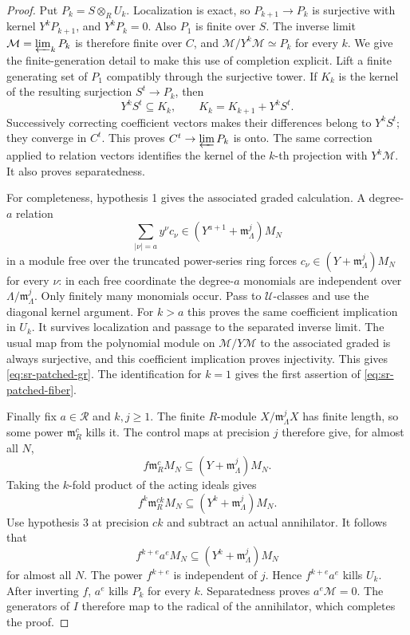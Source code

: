 \begin{proof}
Put $P_k=S\otimes_R U_k$.
Localization is exact, so $P_{k+1}\to P_k$ is surjective with kernel
$Y^kP_{k+1}$, and $Y^kP_k=0$.
Also $P_1$ is finite over $S$.
The inverse limit
$\mathcal M=\varprojlim_kP_k$ is therefore finite over $C$,
and $\mathcal M/Y^k\mathcal M\simeq P_k$ for every $k$.
We give the finite-generation detail to make this use of completion
explicit. Lift a finite generating set of $P_1$ compatibly through the
surjective tower. If $K_k$ is the kernel of the resulting surjection
$S^t\to P_k$, then
\[
             Y^kS^t\subseteq K_k,\qquad
             K_k=K_{k+1}+Y^kS^t.
\]
Successively correcting coefficient vectors makes their differences
belong to $Y^kS^t$; they converge in $C^t$.
This proves $C^t\to\varprojlim P_k$ is onto.
The same correction applied to relation vectors identifies the
kernel of the $k$-th projection with $Y^k\mathcal M$.
It also proves separatedness.

For completeness, hypothesis 1 gives the associated graded
calculation. A degree-$a$ relation
\[
               \sum_{|\nu|=a}y^\nu c_\nu
                           \in(Y^{a+1}+\mathfrak m_\Lambda^j)M_N
\]
in a module free over the truncated power-series ring forces
$c_\nu\in(Y+\mathfrak m_\Lambda^j)M_N$ for every $\nu$:
in each free coordinate the degree-$a$ monomials are independent over
$\Lambda/\mathfrak m_\Lambda^j$.
Only finitely many monomials occur.
Pass to $\mathcal U$-classes and use the diagonal kernel argument.
For $k>a$ this proves the same coefficient implication in $U_k$.
It survives localization and passage to the separated inverse limit.
The usual map from the polynomial module on $\mathcal M/Y\mathcal M$
to the associated graded is always surjective, and this coefficient
implication proves injectivity. This gives
\eqref{eq:sr-patched-gr}.
The identification for $k=1$ gives the first assertion of
\eqref{eq:sr-patched-fiber}.

Finally fix $a\in\mathcal R$ and $k,j\ge1$.
The finite $R$-module $X/\mathfrak m_\Lambda^jX$ has finite length,
so some power $\mathfrak m_R^c$ kills it.
The control maps at precision $j$ therefore give, for almost all $N$,
\[
                   f\mathfrak m_R^cM_N
                            \subseteq(Y+\mathfrak m_\Lambda^j)M_N.
\]
Taking the $k$-fold product of the acting ideals gives
\[
              f^k\mathfrak m_R^{ck}M_N
                            \subseteq(Y^k+\mathfrak m_\Lambda^j)M_N.
\]
Use hypothesis 3 at precision $ck$ and subtract an actual annihilator.
It follows that
\[
              f^{k+e}a^eM_N
                            \subseteq(Y^k+\mathfrak m_\Lambda^j)M_N
\]
for almost all $N$. The power $f^{k+e}$ is independent of $j$.
Hence $f^{k+e}a^e$ kills $U_k$.
After inverting $f$, $a^e$ kills $P_k$ for every $k$.
Separatedness proves $a^e\mathcal M=0$.
The generators of $I$ therefore map to the radical of the annihilator,
which completes the proof.
\end{proof}

